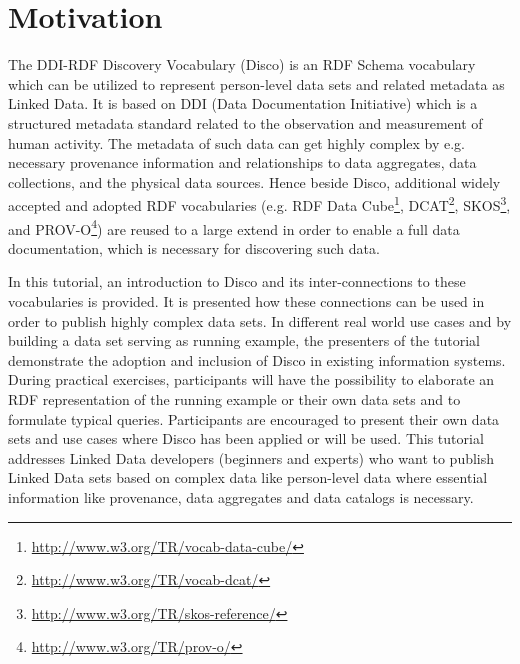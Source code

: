 \documentclass{llncs}
\begin{document}
%

\section{Motivation}
The DDI-RDF Discovery Vocabulary (Disco) \cite{Bosch2012} is an RDF Schema vocabulary which can be utilized to represent person-level data sets and related metadata as Linked Data. 
It is based on DDI (Data Documentation Initiative) which is a structured metadata standard related to the observation and measurement of human activity.
The metadata of such data can get highly complex by e.g. necessary provenance information and relationships to data aggregates, data collections, and the physical data sources.
Hence beside Disco, additional widely accepted and adopted RDF vocabularies (e.g. RDF Data Cube\footnote{\url{http://www.w3.org/TR/vocab-data-cube/}}, DCAT\footnote{\url{http://www.w3.org/TR/vocab-dcat/}}, SKOS\footnote{\url{http://www.w3.org/TR/skos-reference/}}, and PROV-O\footnote{\url{http://www.w3.org/TR/prov-o/}}) are reused to a large extend \cite{Bosch2013} in order to enable a full data documentation, which is necessary for discovering such data.

In this tutorial, an introduction to Disco and its inter-connections to these vocabularies is provided. 
It is presented how these connections can be used in order to publish highly complex data sets.
In different real world use cases and by building a data set serving as running example, the presenters of the tutorial demonstrate the adoption and inclusion of Disco in existing information systems.
During practical exercises, participants will have the possibility to elaborate an RDF representation of the running example or their own data sets and to formulate typical queries.
Participants are encouraged to present their own data sets and use cases where Disco has been applied or will be used. 
This tutorial addresses Linked Data developers (beginners and experts) who want to publish Linked Data sets based on complex data like person-level data where essential information like provenance, data aggregates and data catalogs is necessary.
\end{document}
